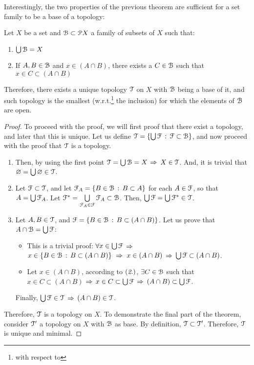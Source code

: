 Interestingly, the two properties of the previous theorem are sufficient for a set family to be a base of a topology:

\begin{theorem}
Let $X$ be a set and $\EuScript{B}\subset \EuScript{P} X$ a family of subsets of $X$ such that:
\begin{enumerate}
\item $\bigcup \EuScript{B} = X$
\item If $A, B\in \EuScript{B}$ and $x\in (A\cap B)$, there exists a $C\in \EuScript{B}$ such that $x\in C\subset (A\cap B)$
\end{enumerate}
Therefore, there exists a unique topology $\EuScript{T}$ on $X$ with $\EuScript{B}$ being a base of it, and such topology is the smallest (w.r.t.\footnote{with respect to} the inclusion) for which the elements of $\EuScript{B}$ are open.
\label{th:1-3}
\end{theorem}

\begin{proof}
To proceed with the proof, we will first proof that there exist a topology, and later that this is unique.
Let us define $\EuScript{T} = \{\bigcup \EuScript{F}\,:\,\EuScript{F}\subset \EuScript{B}\}$, and now proceed with the proof that $\EuScript{T}$ is a topology.
\begin{enumerate}
\item Then, by using the first point $\EuScript{T} =\bigcup \EuScript{B}= X$ $\Rightarrow$ $X\in \EuScript{T}$. And, it is trivial that $\varnothing = \bigcup \varnothing \in \EuScript{T}$.
\item Let $\EuScript{F}\subset \EuScript{T}$, and let $\EuScript{F}_A=\{B\in \EuScript{B}\,:\, B\subset A\}$ for each $A\in\EuScript{F}$, so that $A=\bigcup\EuScript{F}_A$. Let $\EuScript{F}^*=\bigcup\limits_{\EuScript{F}_A\in\EuScript{F}}\EuScript{F}_A\subset\EuScript{B}$. Then,  $\bigcup \EuScript{F} =\bigcup\EuScript{F}^*\in\EuScript{T}$.
\item Let $A, B\in \EuScript{T}$, and $\EuScript{F} = \{B\in\EuScript{B}\,:\, B \subset(A\cap B)\}$. Let us prove that $A\cap\EuScript{B} = \bigcup\EuScript{F}$:
\begin{itemize}
\item[\boxed{\supseteq}] This is a trivial proof: $\forall x\in\bigcup\EuScript{F}$ $\Rightarrow$ $x\in\left\{B\in\EuScript{B}\,:\,B\subset(A\cap B)\right\}\ \Rightarrow\ x\in (A\cap B)$ $\Rightarrow$ $\bigcup\EuScript{F} \subset (A\cap B)$.
\item[\boxed{\subseteq}] Let $x\in (A\cap B)$, according to $(\emph{2.})$, $\exists C\in \EuScript{B}$ such that $x\in C\subset (A\cap B)$ $\Rightarrow$ $x\in C\subset \bigcup\EuScript{F}$ $\Rightarrow$ $(A\cap B)\subset \bigcup\EuScript{F}$. 
\end{itemize}
Finally, $\bigcup \EuScript{F}\in \EuScript{T}$ $\Rightarrow$ $(A\cap B) \in \EuScript{T}$.
\end{enumerate}
Therefore, $\EuScript{T}$ is a topology on $X$. To demonstrate the final part of the theorem, consider $\EuScript{T}'$ a topology on $X$ with $\EuScript{B}$ as base. By definition, $\EuScript{T}\subset \EuScript{T}'$. Therefore, $\EuScript{T}$ is unique and minimal.
\end{proof}

